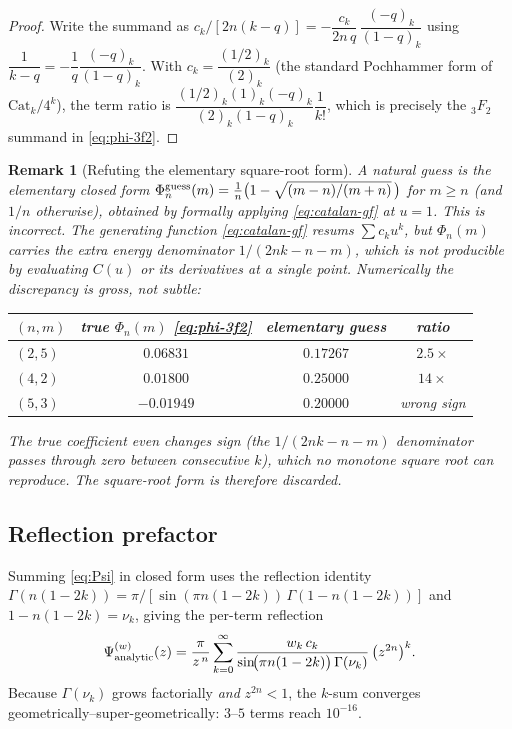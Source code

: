 \documentclass{article}
\newtheorem{remark}{Remark}
\begin{document}
\begin{proof}
Write the summand as $c_k/[2n(k-q)]=-\dfrac{c_k}{2n\,q}\,\dfrac{(-q)_k}{(1-q)_k}$
using $\dfrac{1}{k-q}=-\dfrac{1}{q}\dfrac{(-q)_k}{(1-q)_k}$.  With
$c_k=\dfrac{(1/2)_k}{(2)_k}$ (the standard Pochhammer form of
$\mathrm{Cat}_k/4^k$), the term ratio is
$\dfrac{(1/2)_k(1)_k(-q)_k}{(2)_k(1-q)_k}\dfrac{1}{k!}$, which is precisely the
${}_3F_2$ summand in \eqref{eq:phi-3f2}.
\end{proof}

\begin{remark}[Refuting the elementary square-root form]\label{rem:noroot}
A natural guess is the elementary closed form
$\Phi_n^{\rm guess}(m)=\tfrac1n\bigl(1-\sqrt{(m-n)/(m+n)}\,\bigr)$ for $m\ge n$
(and $1/n$ otherwise), obtained by formally applying \eqref{eq:catalan-gf} at
$u=1$.  \emph{This is incorrect.}  The generating function
\eqref{eq:catalan-gf} resums $\sum c_k u^k$, but $\Phi_n(m)$ carries the extra
energy denominator $1/(2nk-n-m)$, which is \emph{not} producible by evaluating
$C(u)$ or its derivatives at a single point.  Numerically the discrepancy is
gross, not subtle:
\begin{center}
\begin{tabular}{lccc}
\toprule
$(n,m)$ & true $\Phi_n(m)$ \eqref{eq:phi-3f2} & elementary guess & ratio\\
\midrule
$(2,5)$  & $0.06831$ & $0.17267$ & $2.5\times$\\
$(4,2)$  & $0.01800$ & $0.25000$ & $14\times$\\
$(5,3)$  & $-0.01949$ & $0.20000$ & wrong sign\\
\bottomrule
\end{tabular}
\end{center}
The true coefficient even changes sign (the $1/(2nk-n-m)$ denominator passes
through zero between consecutive $k$), which no monotone square root can
reproduce.  The square-root form is therefore discarded.
\end{remark}

\subsection{Reflection prefactor}

Summing \eqref{eq:Psi} in closed form uses the reflection identity
$\Gamma(n(1-2k))=\pi/[\sin(\pi n(1-2k))\,\Gamma(1-n(1-2k))]$ and
$1-n(1-2k)=\nu_k$, giving the per-term reflection
\begin{equation}\label{eq:Psi-reflect}
\Psi^{(w)}_{\rm analytic}(z)
=\frac{\pi}{z^{\,n}}\sum_{k=0}^{\infty}
   \frac{w_k\,c_k}{\sin\!\bigl(\pi n(1-2k)\bigr)\,\Gamma(\nu_k)}\,
   \bigl(z^{2n}\bigr)^k .
\end{equation}
Because $\Gamma(\nu_k)$ grows factorially \emph{and} $z^{2n}<1$, the
$k$-sum converges geometrically--super-geometrically: $3$--$5$ terms reach
$10^{-16}$.
\end{document}
